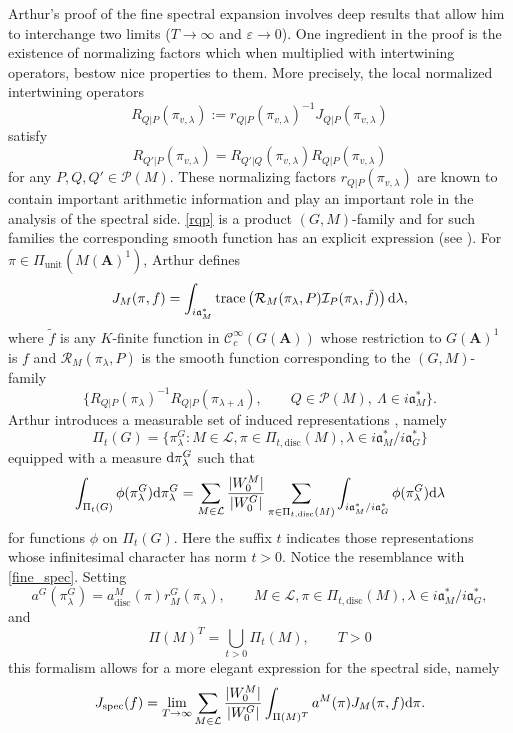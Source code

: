 \documentclass{ims9x6}
\def\A{\mathbf A}
\def\CCC{\mathcal C}
\def\III{\mathcal I}
\def\LLL{\mathcal L}
\def\PPP{\mathcal P}
\def\aaa{\mathfrak a}
\def\d{\text d}
\def\mod#1{\lvert #1 \rvert} %
\def\RRR{\mathcal R}
\def\trace{\operatorname{trace}}
\begin{document}
Arthur's proof of the fine spectral expansion involves deep results that allow him to interchange two limits ($T \to \infty$ and $\varepsilon \to 0$). One ingredient in the proof is the existence of normalizing factors which when multiplied with intertwining operators, bestow nice properties to them. More precisely, the local normalized intertwining operators
\begin{equation} \label{rqp}
	R_{Q|P}(\pi_{v, \lambda}) := r_{Q|P}(\pi_{v, \lambda})^{-1} J_{Q|P}(\pi_{v, \lambda})
\end{equation}
satisfy
\[ R_{Q'|P}(\pi_{v, \lambda}) = R_{Q'|Q}(\pi_{v, \lambda}) R_{Q|P}(\pi_{v, \lambda}) \]
for any $P, Q, Q' \in \PPP(M)$. These normalizing factors $r_{Q|P}(\pi_{v, \lambda})$ are known to contain important arithmetic information and play an important role in the analysis of the spectral side. \cref{rqp} is a product $(G, M)$-family and for such families the corresponding smooth function has an explicit expression (see \cite[\S 17]{clay}). For $\pi \in \Pi_{\text{unit}}(M(\A)^1)$, Arthur defines 
\begin{equation} \label{jmpi}
	J_M(\pi, f) = \int_{i\aaa_M^*} \trace \left( \RRR_M(\pi_\lambda, P) \III_P(\pi_\lambda, \tilde f) \right) \d \lambda,
\end{equation}
where $\tilde f$ is any $K$-finite function in $\CCC_c^\infty(G(\A))$ whose restriction to $G(\A)^1$ is $f$ and $\RRR_M(\pi_\lambda, P)$ is the smooth function corresponding to the $(G, M)$-family
\[ \{ R_{Q|P}(\pi_\lambda)^{-1} R_{Q|P}(\pi_{\lambda + \Lambda}), \qquad Q \in \PPP(M), \ \Lambda \in i\aaa_M^* \}. \]
Arthur introduces a measurable set of induced representations \cite[Equation (22.6)]{clay}, namely
\[ \Pi_t(G) = \{ \pi_\lambda^G : M \in \LLL, \pi \in \Pi_{t, \text{disc}}(M), \lambda \in i\aaa_M^*/i\aaa_G^*  \} \]
equipped with a measure $\d \pi_\lambda^G$ such that 
\[ \int_{\Pi_t(G)} \phi(\pi_\lambda^G) \d \pi_\lambda^G = \sum_{M \in \LLL} \frac{\mod{W_0^M}}{\mod{W_0^G}} 
	\sum_{\pi \in \Pi_{t, \text{disc}}(M)} \int_{i\aaa_M^* / i\aaa_G^*} \phi(\pi_\lambda^G) \d \lambda \]
for functions $\phi$ on $\Pi_t(G)$. Here the suffix $t$ indicates those representations whose infinitesimal character has norm $t>0$. Notice the resemblance with \cref{fine_spec}. Setting
\[ a^G(\pi_\lambda^G) = a_{\text{disc}}^M(\pi) r_M^G(\pi_\lambda), \qquad M \in \LLL, \pi \in \Pi_{t, \text{disc}}(M), \lambda \in i\aaa_M^* / i\aaa_G^*, \]
and 
\[ \Pi(M)^T = \bigcup_{t > 0} \Pi_t(M), \qquad T > 0 \]
this formalism allows for a more elegant expression for the spectral side, namely
\[ J_{\text{spec}}(f) = \lim_{T \to \infty} \sum_{M \in \LLL} \frac{\mod{W_0^M}}{\mod{W_0^G}} \int_{\Pi(M)^T} a^M(\pi) J_M(\pi, f) \d \pi. \]
\end{document}
